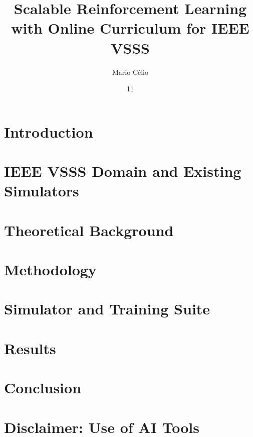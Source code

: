 \documentclass[tg, eng]{ita}    %
\author{Mario Célio}{da Silva Bezerra}
\title{Scalable Reinforcement Learning with Online Curriculum for IEEE VSSS}
\date{11}{November}{2026}
\begin{document}


\mainmatter

\chapter{Introduction}
\label{chap:intro}


\chapter{IEEE VSSS Domain and Existing Simulators}
\label{chap:vsss}


\chapter{Theoretical Background}
\label{chap:theory}


\chapter{Methodology}
\label{chap:training}


\chapter{Simulator and Training Suite}
\label{chap:sim}


\chapter{Results}
\label{chap:results}


\chapter{Conclusion}
\label{chap:conclusion}


\chapter*{Disclaimer: Use of AI Tools}


\renewcommand\bibname{\itareferencesnamebabel} %
\printbibliography

% 
%
% 
\end{document}
